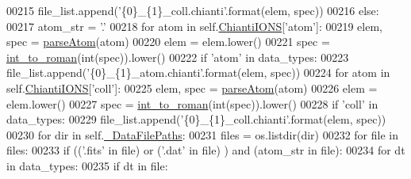 \begin{DoxyCode}
00215                     file\_list.append(\textcolor{stringliteral}{'\{0\}\_\{1\}\_coll.chianti'}.format(elem, spec))
00216         \textcolor{keywordflow}{else}:
00217             atom\_str = \textcolor{stringliteral}{'.'}
00218             \textcolor{keywordflow}{for} atom \textcolor{keywordflow}{in} self.\hyperlink{classpyneb_1_1utils_1_1manage__atomic__data_1_1___manage_atomic_data_a06491f5f808df3d4e58b35e09db74a18}{ChiantiIONS}[\textcolor{stringliteral}{'atom'}]:
00219                 elem, spec = \hyperlink{namespacepyneb_1_1utils_1_1misc_a8c069186002a3e73dd474958e35034d5}{parseAtom}(atom)
00220                 elem = elem.lower()
00221                 spec = \hyperlink{namespacepyneb_1_1utils_1_1misc_aec4e973d4cb9299f749ef190ea636a06}{int\_to\_roman}(int(spec)).lower()
00222                 \textcolor{keywordflow}{if} \textcolor{stringliteral}{'atom'} \textcolor{keywordflow}{in} data\_types:
00223                     file\_list.append(\textcolor{stringliteral}{'\{0\}\_\{1\}\_atom.chianti'}.format(elem, spec))
00224             \textcolor{keywordflow}{for} atom \textcolor{keywordflow}{in} self.\hyperlink{classpyneb_1_1utils_1_1manage__atomic__data_1_1___manage_atomic_data_a06491f5f808df3d4e58b35e09db74a18}{ChiantiIONS}[\textcolor{stringliteral}{'coll'}]:
00225                 elem, spec = \hyperlink{namespacepyneb_1_1utils_1_1misc_a8c069186002a3e73dd474958e35034d5}{parseAtom}(atom)
00226                 elem = elem.lower()
00227                 spec = \hyperlink{namespacepyneb_1_1utils_1_1misc_aec4e973d4cb9299f749ef190ea636a06}{int\_to\_roman}(int(spec)).lower()
00228                 \textcolor{keywordflow}{if} \textcolor{stringliteral}{'coll'} \textcolor{keywordflow}{in} data\_types:
00229                     file\_list.append(\textcolor{stringliteral}{'\{0\}\_\{1\}\_coll.chianti'}.format(elem, spec))
00230         \textcolor{keywordflow}{for} dir \textcolor{keywordflow}{in} self.\hyperlink{classpyneb_1_1utils_1_1manage__atomic__data_1_1___manage_atomic_data_a92da10ed6b2395c54f88300c05a71ae9}{\_DataFilePaths}:
00231             files = os.listdir(dir)
00232             \textcolor{keywordflow}{for} file \textcolor{keywordflow}{in} files:
00233                 \textcolor{keywordflow}{if} ((\textcolor{stringliteral}{'.fits'} \textcolor{keywordflow}{in} file) \textcolor{keywordflow}{or} (\textcolor{stringliteral}{'.dat'} \textcolor{keywordflow}{in} file) ) \textcolor{keywordflow}{and} (atom\_str \textcolor{keywordflow}{in} file):
00234                     \textcolor{keywordflow}{for} dt \textcolor{keywordflow}{in} data\_types:
00235                         \textcolor{keywordflow}{if} dt \textcolor{keywordflow}{in} file:

\end{DoxyCode}
